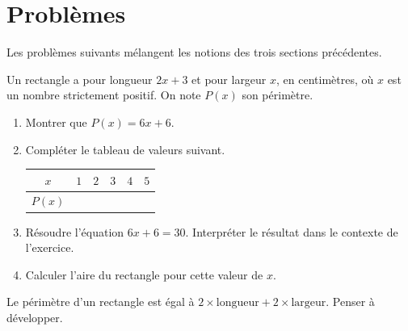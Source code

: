 \documentclass[10pt,a4paper]{article}
\begin{document}
\section{Problèmes}

Les problèmes suivants mélangent les notions des trois sections précédentes.
\nopagebreak

\begin{bloc}
\begin{exo}[Un rectangle]
Un rectangle a pour longueur \(2x+3\) et pour largeur \(x\), en centimètres, où \(x\) est un nombre strictement positif. On note \(P(x)\) son périmètre.
\begin{enumerate}[leftmargin=*]
    \item Montrer que \(P(x)=6x+6\).
    \item Compléter le tableau de valeurs suivant.

    \begin{center}
    \renewcommand{\arraystretch}{1.5}
    \begin{tabular}{|*{6}{c|}}
        \hline
        \(x\) & \(1\) & \(2\) & \(3\) & \(4\) & \(5\) \\ \hline
        \(P(x)\) & & & & & \\ \hline
    \end{tabular}
    \end{center}
    \item Résoudre l'équation \(6x+6=30\). Interpréter le résultat dans le contexte de l'exercice.
    \item Calculer l'aire du rectangle pour cette valeur de \(x\).
\end{enumerate}

\begin{indication}
Le périmètre d'un rectangle est égal à \(2\times\text{longueur}+2\times\text{largeur}\). Penser à développer.
\end{indication}
\end{exo}
\end{bloc}
\end{document}
